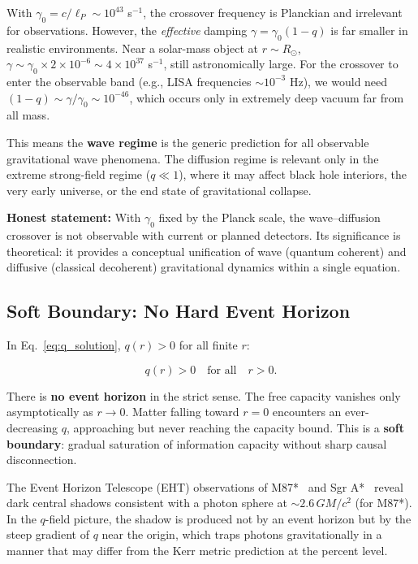 \documentclass[aps,prd,twocolumn,showpacs,superscriptaddress,preprintnumbers]{revtex4-2}
\begin{document}
With $\gamma_0=c/\ell_P\sim10^{43}$ s$^{-1}$, the crossover frequency is Planckian and irrelevant for observations.
However, the \emph{effective} damping $\gamma=\gamma_0(1-q)$ is far smaller in realistic environments.
Near a solar-mass object at $r\sim R_\odot$, $\gamma\sim\gamma_0\times2\times10^{-6}\sim4\times10^{37}$ s$^{-1}$, still astronomically large.
For the crossover to enter the observable band (e.g., LISA frequencies $\sim10^{-3}$ Hz), we would need $(1-q)\sim\gamma/\gamma_0\sim10^{-46}$, which occurs only in extremely deep vacuum far from all mass.

This means the \textbf{wave regime} is the generic prediction for all observable gravitational wave phenomena.
The diffusion regime is relevant only in the extreme strong-field regime ($q\ll1$), where it may affect black hole interiors, the very early universe, or the end state of gravitational collapse.

\textbf{Honest statement:} With $\gamma_0$ fixed by the Planck scale, the wave--diffusion crossover is not observable with current or planned detectors.
Its significance is theoretical: it provides a conceptual unification of wave (quantum coherent) and diffusive (classical decoherent) gravitational dynamics within a single equation.

\subsection{Soft Boundary: No Hard Event Horizon}

In Eq.~\eqref{eq:q_solution}, $q(r)>0$ for all finite $r$:

\begin{equation}
q(r) > 0 \quad \text{for all} \quad r > 0.
\label{eq:soft}
\end{equation}

There is \textbf{no event horizon} in the strict sense.
The free capacity vanishes only asymptotically as $r\to0$.
Matter falling toward $r=0$ encounters an ever-decreasing $q$, approaching but never reaching the capacity bound.
This is a \textbf{soft boundary}: gradual saturation of information capacity without sharp causal disconnection.

The Event Horizon Telescope (EHT) observations of M87*~\cite{EventHorizonTelescope:2019dse} and Sgr A*~\cite{EventHorizonTelescope:2022xnr} reveal dark central shadows consistent with a photon sphere at $\sim2.6\,GM/c^2$ (for M87*).
In the $q$-field picture, the shadow is produced not by an event horizon but by the steep gradient of $q$ near the origin, which traps photons gravitationally in a manner that may differ from the Kerr metric prediction at the percent level.
\end{document}
